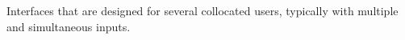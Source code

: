 \begin{definition} \label{def:shareable_interface} 
  Interfaces that are designed for several collocated users, typically with multiple and simultaneous inputs. \cite[p. 202]{rogers}  
\end{definition}